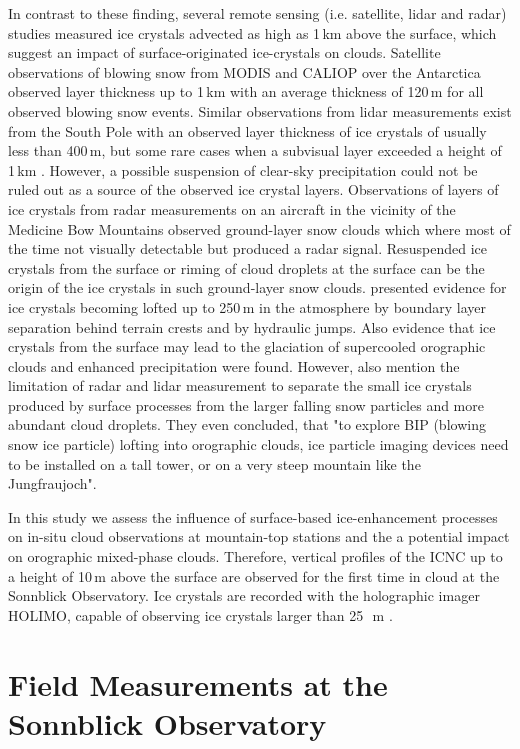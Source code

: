 \documentclass[draft,linenumbers]{agujournal}
\begin{document}
In contrast to these finding, several remote sensing (i.e. satellite, lidar and radar) studies measured ice crystals advected as high as 1\,\si{km} above the surface, which suggest an impact of surface-originated ice-crystals on clouds. Satellite observations of blowing snow from MODIS and CALIOP over the Antarctica \citep{Pal11} observed layer thickness up to 1\,\si{km} with an average thickness of 120\,\si{m} for all observed blowing snow events. Similar observations from lidar measurements exist from the South Pole with an observed layer thickness of ice crystals of usually less than 400\,\si{m}, but some rare cases when a subvisual layer exceeded a height of 1\,\si{km} \citep{Mah03}. However, a possible suspension of clear-sky precipitation could not be ruled out as a source of the observed ice crystal layers. Observations of layers of ice crystals from radar measurements on an aircraft in the vicinity of the Medicine Bow Mountains \citep{Val12} observed ground-layer snow clouds which where most of the time not visually detectable but produced a radar signal. Resuspended ice crystals from the surface or riming of cloud droplets at the surface can be the origin of the ice crystals in such ground-layer snow clouds. \citet{Gee15} presented evidence for ice crystals becoming lofted up to 250\,\si{m} in the atmosphere by boundary layer separation behind terrain crests and by hydraulic jumps. Also evidence that ice crystals from the surface may lead to the glaciation of supercooled orographic clouds and enhanced precipitation were found. However, \citet{Gee15} also mention the limitation of radar and lidar measurement to separate the small ice crystals produced by surface processes from the larger falling snow particles and more abundant cloud droplets. They even concluded, that "to explore BIP (blowing snow ice particle) lofting into orographic clouds, ice particle imaging devices need to be installed on a tall tower, or on a very steep mountain like the Jungfraujoch".

In this study we assess the influence of surface-based ice-enhancement processes on in-situ cloud observations at mountain-top stations and the a potential impact on orographic mixed-phase clouds. Therefore, vertical profiles of the ICNC up to a height of 10\,\si{m} above the surface are observed for the first time in cloud at the Sonnblick Observatory. Ice crystals are recorded with the holographic imager HOLIMO, capable of observing ice crystals larger than 25\,\si{\mu m} \citep{Bec17}. 

\section{Field Measurements at the Sonnblick Observatory}
\label{sectionMeasurementSite}
\end{document}
